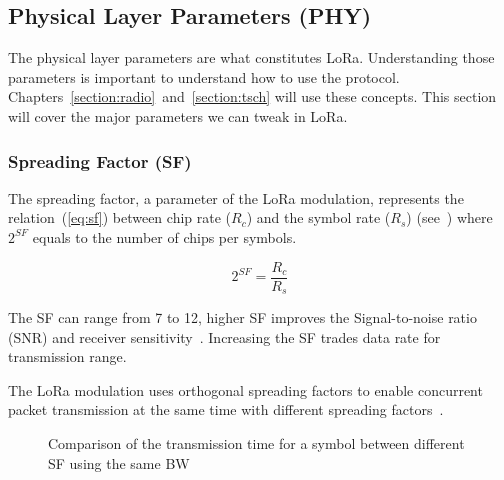 \subsection{Physical Layer Parameters (PHY)}

The physical layer parameters are what constitutes LoRa. 
Understanding those parameters is important to understand how to use the
protocol.
Chapters~\ref{section:radio}~and~\ref{section:tsch} will use these concepts.
This section will cover the major parameters we can tweak in LoRa.

\subsubsection{Spreading Factor (SF)}

The spreading factor, a parameter of the LoRa modulation, represents the
relation~(\ref{eq:sf}) between chip rate ($R_{c}$) and the symbol rate ($R_{s}$)
(see~\cite{semtech:modemdesign}) where $2^{SF}$ equals to the number of chips per
symbols.

\begin{equation}
 \label{eq:sf} 
  2^{SF} = \frac{R_c}{R_s}
\end{equation}

The SF can range from 7 to 12, higher SF improves the Signal-to-noise ratio
(SNR) and receiver sensitivity~\cite{semtech:modemdesign}.
Increasing the SF trades data rate for transmission range.

The LoRa modulation uses orthogonal spreading factors to enable concurrent
packet transmission at the same time with different
spreading factors~\cite{semtech:modulationbasics}.

\begin{figure}[H]
\centering
{} 
\caption{Comparison of the transmission time for a symbol between different SF
  using the same BW\label{fig:sfcomp}}
\end{figure}

